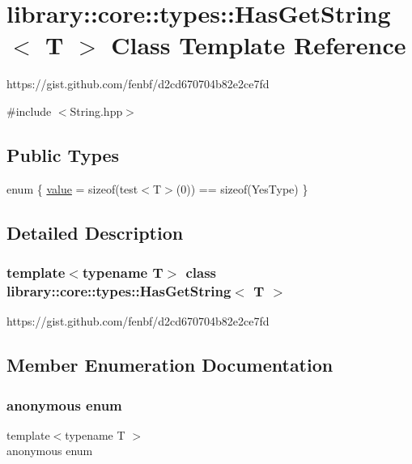 \hypertarget{classlibrary_1_1core_1_1types_1_1_has_get_string}{}\section{library\+:\+:core\+:\+:types\+:\+:Has\+Get\+String$<$ T $>$ Class Template Reference}
\label{classlibrary_1_1core_1_1types_1_1_has_get_string}


https\+://gist.github.\+com/fenbf/d2cd670704b82e2ce7fd  




{\ttfamily \#include $<$String.\+hpp$>$}

\subsection*{Public Types}
\begin{DoxyCompactItemize}
\item 
enum \{ \hyperlink{classlibrary_1_1core_1_1types_1_1_has_get_string_a081f4360067f3eb25ebdafd63aac3afbaafc31eb372de8416da665553a385b5d7}{value} = sizeof(test$<$T$>$(0)) == sizeof(Yes\+Type)
 \}
\end{DoxyCompactItemize}


\subsection{Detailed Description}
\subsubsection*{template$<$typename T$>$\newline
class library\+::core\+::types\+::\+Has\+Get\+String$<$ T $>$}

https\+://gist.github.\+com/fenbf/d2cd670704b82e2ce7fd 

\subsection{Member Enumeration Documentation}
\mbox{\label{classlibrary_1_1core_1_1types_1_1_has_get_string_a081f4360067f3eb25ebdafd63aac3afb}} 
\subsubsection{\texorpdfstring{anonymous enum}{anonymous enum}}
{\footnotesize\ttfamily template$<$typename T $>$ \\
anonymous enum}

